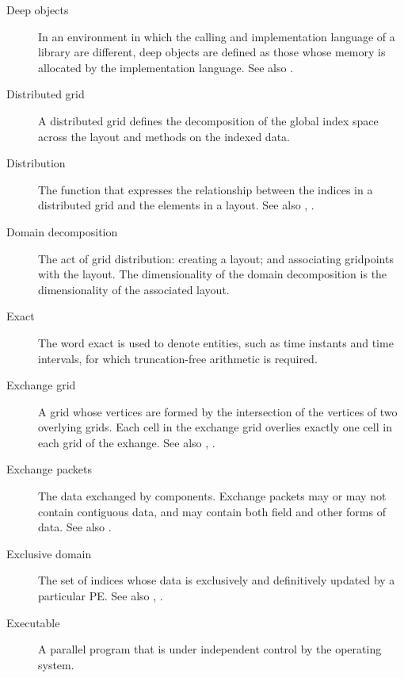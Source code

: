 \begin{description}
\item[Deep objects] \label{glos:DeepObjects} In an environment
  in which the calling and implementation language of a library are
  different, deep objects are defined as those whose memory is 
  allocated by the implementation language. 
  See also . 

\item[Distributed grid] \label{glos:DistGrid}
  A distributed grid defines the decomposition of the global index space 
  across the layout and methods on the indexed data.

\item[Distribution] \label{glos:Distribution} The function that expresses
  the relationship between the indices in a distributed grid and the elements 
  in a layout. See also , 
  . 

\item[Domain decomposition] \label{glos:DomainDecomp} The act of grid 
  distribution: creating a layout; and associating gridpoints with the layout. 
  The dimensionality of the domain decomposition is the dimensionality of 
  the associated layout.

\item [Exact] \label{glos:Exact} The word exact is used
  to denote entities, such as time instants and time intervals, for 
  which truncation-free arithmetic is required. 

\item[Exchange grid] \label{glos:ExchangeGrid} A grid whose vertices are
  formed by the intersection of the vertices of two overlying grids.  Each 
  cell in the exchange grid overlies exactly one cell in each grid of the 
  exhange. See also , .

\item[Exchange packets] \label{glos:EP} The data exchanged by components.  
  Exchange packets may or may not contain contiguous data, and may contain 
  both field and other forms of data. See also .

\item[Exclusive domain] \label{glos:ExcDomain} The set of indices whose 
  data is exclusively and definitively updated by a particular PE. 
  See also , 
  .

\item[Executable] \label{glos:Exec} 
  A parallel program that is under independent control by the operating 
  system.


\end{description}
